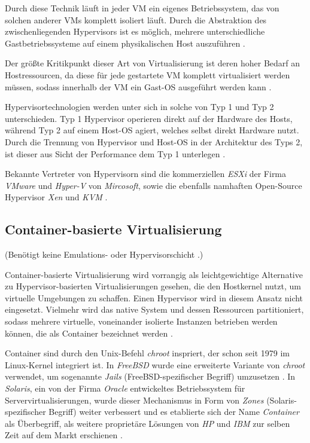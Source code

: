 \documentclass[../main.tex]{subfiles}
\begin{document}
      Durch diese Technik läuft in jeder VM ein eigenes Betriebssystem, das von solchen anderer VMs komplett isoliert läuft. Durch die Abstraktion des zwischenliegenden Hypervisors ist es möglich, mehrere unterschiedliche Gastbetriebssysteme auf einem physikalischen Host auszuführen \cite[S.2]{containerVirtPerformance}.

      Der größte Kritikpunkt dieser Art von Virtualisierung ist deren hoher Bedarf an Hostressourcen, da diese für jede gestartete VM komplett virtualisiert werden müssen, sodass innerhalb der VM ein Gast-OS ausgeführt werden kann \cite[S.1]{dockerIntroIEEE}\cite[S.3]{dockerLXCKub}.

      Hypervisortechnologien werden unter sich in solche von Typ 1 und Typ 2 unterschieden. Typ 1 Hypervisor operieren direkt auf der Hardware des Hosts, während Typ 2 auf einem Host-OS agiert, welches selbst direkt Hardware nutzt. Durch die Trennung von Hypervisor und Host-OS in der Architektur des Typs 2, ist dieser aus Sicht der Performance dem Typ 1 unterlegen \cite[S.2]{dockerSec1}.

      Bekannte Vertreter von Hypervisorn sind die kommerziellen \emph{ESXi} der Firma \emph{VMware} und \emph{Hyper-V} von \emph{Mircosoft}, sowie die ebenfalls namhaften Open-Source Hypervisor \emph{Xen} und \emph{KVM} \cite[S.1]{dockerLXCKub}.

    \subsection{Container-basierte Virtualisierung}
    \label{introVirtContainer}
      (Benötigt keine Emulations- oder Hypervisorschicht \cite[S.7]{dockerBook}.)

      Container-basierte Virtualisierung wird vorrangig als leichtgewichtige Alternative zu Hypervisor-basierten Virtualisierungen gesehen\cite[S.2]{containerVirtPerformance}, die den Hostkernel nutzt, um virtuelle Umgebungen zu schaffen. Einen Hypervisor wird in diesem Ansatz nicht eingesetzt. Vielmehr wird das native System und dessen Ressourcen partitioniert, sodass mehrere virtuelle, voneinander isolierte Instanzen betrieben werden können, die als Container bezeichnet werden \cite[S.2]{containerVirtPerformance}\cite[S.1]{dockerSec1}.

      Container sind durch den Unix-Befehl \emph{chroot}\cite{chroot} inspriert, der schon seit 1979 im Linux-Kernel integriert ist. In \emph{FreeBSD} wurde eine erweiterte Variante von \emph{chroot} verwendet, um sogenannte \emph{Jails} (FreeBSD-spezifischer Begriff) umzusetzen \cite{jails}. In \emph{Solaris}, ein von der Firma \emph{Oracle} entwickeltes Betriebssystem für Servervirtualisierungen\cite{solaris}, wurde dieser Mechanismus in Form von \emph{Zones} (Solaris-spezifischer Begriff) \cite{zones} weiter verbessert und es etablierte sich der Name \emph{Container} als Überbegriff, als weitere proprietäre Lösungen von \emph{HP} und \emph{IBM} zur selben Zeit auf dem Markt erschienen \cite[S.2]{dockerLXCKub}.
\end{document}
